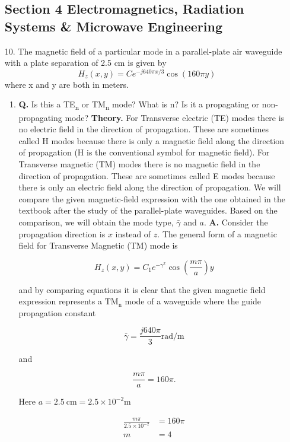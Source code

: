 \documentclass[main.tex]{subfiles}
\begin{document}
\begin{enumerate}

\subsection*{Section 4 Electromagnetics, Radiation Systems \& Microwave Engineering}

\item [10.] The magnetic field of a particular mode in a parallel-plate air waveguide with a plate separation of 2.5 cm is given by
$$H_{z}(x, y)=C e^{-j 640 \pi x / 3} \cos (160 \pi y)$$
where x and y are both in meters.
    
    \begin{enumerate}
        \item \textbf{Q.} Is this a TE\textsubscript{n} or TM\textsubscript{n} mode? What is n? Is it a propagating or non-propagating mode? \textbf{Theory.} For Transverse electric (TE) modes there is no electric field in the direction of propagation. These are sometimes called H modes because there is only a magnetic field along the direction of propagation (H is the conventional symbol for magnetic field). For Transverse magnetic (TM) modes there is no magnetic field in the direction of propagation. These are sometimes called E modes because there is only an electric field along the direction of propagation. We will compare the given magnetic-field expression with the one obtained in the textbook after the study of the parallel-plate waveguides. Based on the comparison, we will obtain the mode type, $\bar{\gamma}$ and $a$. \textbf{A.} Consider the propagation direction is $x$ instead of $z$. The general form of a magnetic field for Transverse Magnetic (TM) mode is
        
        $$
        H_z(x, y)=C_1 e^{-\gamma^x} \cos \left(\frac{m \pi}{a}\right) y
        $$
        
        and by comparing equations it is clear that the given magnetic field expression represents a $\mathrm{TM_n}$ mode of a waveguide  where the guide propagation constant

        $$
        \bar{\gamma} = \frac{j 640 \pi}{3} \mathrm{rad}/\mathrm{m}
        $$

        and

        $$
        \frac{m \pi}{a} = 160 \pi.
        $$
        
        Here $a=2.5 \mathrm{~cm}=2.5 \times 10^{-2} \mathrm{m}$

        $$
        \begin{aligned}
        \frac{m \pi}{2.5 \times 10^{-2}} &= 160 \pi \\
        m &= 4
        \end{aligned}
        $$


\end{enumerate}
\end{enumerate}
\end{document}
